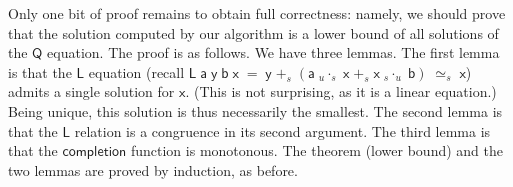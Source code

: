 \documentclass{CSML}
\numberwithin{theorem}{section}
\newcommand{\Conid}[1]{\mathit{#1}}
\newcommand{\Varid}[1]{\mathit{#1}}
\renewcommand\Varid[1]{\ensuremath{\mathsf{#1}}}
\renewcommand\Conid[1]{\ensuremath{\mathsf{#1}}}
\begin{document}
Only one bit of proof remains to obtain full correctness: namely, we
should prove that the solution computed by our algorithm is a lower
bound of all solutions of the \ensuremath{\Conid{Q}} equation.
The proof is as follows. We have three lemmas. The first lemma is that the
\ensuremath{\Conid{L}} equation (recall \ensuremath{\Conid{L}\;\Varid{a}\;\Varid{y}\;\Varid{b}\;\Varid{x}\;\mathrel{=}\;\Varid{y}\;\mathbin{+_s}\;(\Varid{a}\;\mathbin{{_u}\!·_s}\;\Varid{x}\;\mathbin{+_s}\;\Varid{x}\;\mathbin{{_s}\!·_u}\;\Varid{b})\;\mathrel{≃_s}\;\Varid{x}})
admits a single solution for \ensuremath{\Varid{x}}. (This is not surprising, as it is
a linear equation.) Being unique, this solution is thus necessarily the
smallest.
The second lemma is that the \ensuremath{\Conid{L}} relation is a congruence in its second argument.
The third lemma is that the \ensuremath{\Varid{completion}} function is monotonous.
The theorem (lower bound) and the two lemmas are proved by induction, as before.
\end{document}
